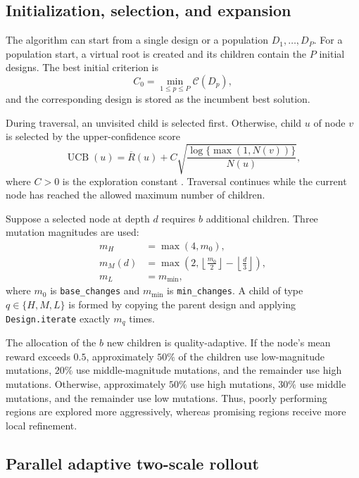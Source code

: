 \documentclass[twoside]{article}
\newcommand{\Crit}{\mathcal{C}}
\begin{document}
\subsection{Initialization, selection, and expansion}

The algorithm can start from a single design or a population
$D_1,\ldots,D_P$. For a population start, a virtual root is created and its
children contain the $P$ initial designs. The best initial criterion is
\[
    C_0=\min_{1\leq p\leq P}\Crit(D_p),
\]
and the corresponding design is stored as the incumbent best solution.

During traversal, an unvisited child is selected first. Otherwise, child $u$ of
node $v$ is selected by the upper-confidence score
\begin{equation}\label{eq:ucb}
    \operatorname{UCB}(u)
    =\overline R(u)
     +C\sqrt{\frac{\log\{\max(1,N(v))\}}{N(u)}},
\end{equation}
where $C>0$ is the exploration constant \cite{KocsisSzepesvari2006,Browne2012}.
Traversal continues while the current node has reached the allowed maximum
number of children.

Suppose a selected node at depth $d$ requires $b$ additional children. Three
mutation magnitudes are used:
\begin{align*}
    m_H &= \max(4,m_0),\\
    m_M(d) &= \max\!\left(2,\left\lfloor\frac{m_0}{2}\right\rfloor
                   -\left\lfloor\frac{d}{3}\right\rfloor\right),\\
    m_L &= m_{\min},
\end{align*}
where $m_0$ is {\tt base\_changes} and $m_{\min}$ is
{\tt min\_changes}. A child of type $q\in\{H,M,L\}$ is formed by copying the
parent design and applying {\tt Design.iterate} exactly $m_q$ times.

The allocation of the $b$ new children is quality-adaptive. If the node's mean
reward exceeds $0.5$, approximately $50\%$ of the children use low-magnitude
mutations, $20\%$ use middle-magnitude mutations, and the remainder use high
mutations. Otherwise, approximately $50\%$ use high mutations, $30\%$ use
middle mutations, and the remainder use low mutations. Thus, poorly performing
regions are explored more aggressively, whereas promising regions receive more
local refinement.

\subsection{Parallel adaptive two-scale rollout}
\end{document}
